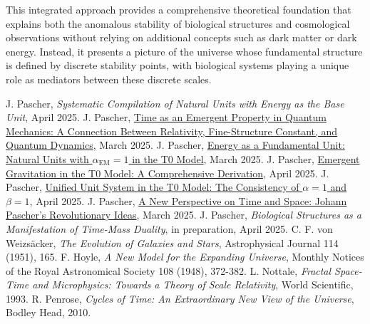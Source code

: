 \documentclass[12pt,a4paper]{article}
\newcommand{\alphaEM}{\alpha_{\text{EM}}}
\begin{document}
		This integrated approach provides a comprehensive theoretical foundation that explains both the anomalous stability of biological structures and cosmological observations without relying on additional concepts such as dark matter or dark energy. Instead, it presents a picture of the universe whose fundamental structure is defined by discrete stability points, with biological systems playing a unique role as mediators between these discrete scales.
		
		
		\begin{thebibliography}{99}
			 J. Pascher, \textit{Systematic Compilation of Natural Units with Energy as the Base Unit}, April 2025.
			 J. Pascher, \href{https://github.com/jpascher/T0-Time-Mass-Duality/blob/main/2/pdf/English/ZeitEmergentQMEn.pdf}{Time as an Emergent Property in Quantum Mechanics: A Connection Between Relativity, Fine-Structure Constant, and Quantum Dynamics}, March 2025.
			 J. Pascher, \href{https://github.com/jpascher/T0-Time-Mass-Duality/blob/main/2/pdf/English/NatEinheitenAlpha1En.pdf}{Energy as a Fundamental Unit: Natural Units with $\alphaEM = 1$ in the T0 Model}, March 2025.
			 J. Pascher, \href{https://github.com/jpascher/T0-Time-Mass-Duality/blob/main/2/pdf/English/EmergentGravT0En.pdf}{Emergent Gravitation in the T0 Model: A Comprehensive Derivation}, April 2025.
			 J. Pascher, \href{https://github.com/jpascher/T0-Time-Mass-Duality/blob/main/2/pdf/English/Alpha1Beta1KonsistenzEn.pdf}{Unified Unit System in the T0 Model: The Consistency of $\alpha = 1$ and $\beta = 1$}, April 2025.
			 J. Pascher, \href{https://github.com/jpascher/T0-Time-Mass-Duality/blob/main/2/pdf/English/ZeitRaumPascherEn.pdf}{A New Perspective on Time and Space: Johann Pascher’s Revolutionary Ideas}, March 2025.
			 J. Pascher, \textit{Biological Structures as a Manifestation of Time-Mass Duality}, in preparation, April 2025.
			 C. F. von Weizsäcker, \textit{The Evolution of Galaxies and Stars}, Astrophysical Journal 114 (1951), 165.
			 F. Hoyle, \textit{A New Model for the Expanding Universe}, Monthly Notices of the Royal Astronomical Society 108 (1948), 372-382.
			 L. Nottale, \textit{Fractal Space-Time and Microphysics: Towards a Theory of Scale Relativity}, World Scientific, 1993.
			 R. Penrose, \textit{Cycles of Time: An Extraordinary New View of the Universe}, Bodley Head, 2010.

\end{thebibliography}
\end{document}
